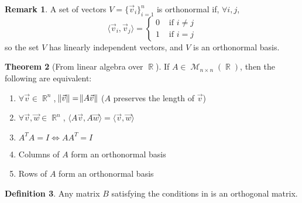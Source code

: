 \documentclass[11pt]{amsart} %
\theoremstyle{definition}
\newtheorem{definition}{Definition}[section]
\newtheorem{theorem}[definition]{Theorem}
\theoremstyle{definition}
\newtheorem{remark}[definition]{Remark}
\DeclareMathOperator{\R}{\mathbb{R}}
\DeclareMathOperator{\Ma}{\mathcal{M}}
\numberwithin{equation}{section}
\begin{document}
\begin{remark}
	A set of vectors $V = \{ \vec{v}_i  \}_{i=1}^{n}$ is orthonormal if, $\forall i,j$,
	$$ \langle \vec{v}_i,\vec{v}_j \rangle = \begin{cases}
	0 & \text{ if } i \neq j \\
	1 & \text{ if } i = j	
	\end{cases}$$
	so the set $V$ has linearly independent vectors, and $V$ is an orthonormal basis.
\end{remark}

\begin{theorem}[From linear algebra over $\R$]
	\label{thm1orthogmatrix}
	If $A \in \Ma_{n \times n} (\R)$, then the following are equivalent:
	\begin{enumerate}%
		\item $\forall \vec{v} \in \R^n$, $\norm{\vec{v}} = \norm{A \vec{v}}$ ($A$ preserves the length of $\vec{v}$)  
		\item $\forall \vec{v}, \vec{w} \in \R^n$, $ \langle A \vec{v},A \vec{w} \rangle = \langle \vec{v},\vec{w} \rangle	$
		\item $A^T A = I \iff A A^T = I $
		\item Columns of $A$ form an orthonormal basis
		\item Rows of $A$ form an orthonormal basis
	\end{enumerate}
\end{theorem}

\begin{definition}
	Any matrix $B$ satisfying the conditions in  is an orthogonal matrix.
\end{definition}
\end{document}
